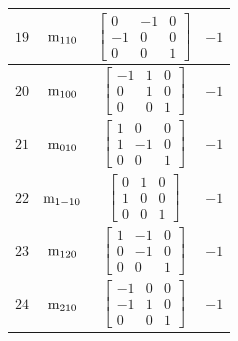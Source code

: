 \documentclass[fleqn,8pt]{jsarticle}
\begin{document}
\begin{longtable}{cccc}
$ 19 $ & $ {\rm m}_{110} $ & $ \begin{bmatrix} 0 & -1 & 0 \\ -1 & 0 & 0 \\ 0 & 0 & 1 \end{bmatrix} $ & $ -1 $ \\ \hline
$ 20 $ & $ {\rm m}_{100} $ & $ \begin{bmatrix} -1 & 1 & 0 \\ 0 & 1 & 0 \\ 0 & 0 & 1 \end{bmatrix} $ & $ -1 $ \\ \hline
$ 21 $ & $ {\rm m}_{010} $ & $ \begin{bmatrix} 1 & 0 & 0 \\ 1 & -1 & 0 \\ 0 & 0 & 1 \end{bmatrix} $ & $ -1 $ \\ \hline
$ 22 $ & $ {\rm m}_{1-10} $ & $ \begin{bmatrix} 0 & 1 & 0 \\ 1 & 0 & 0 \\ 0 & 0 & 1 \end{bmatrix} $ & $ -1 $ \\ \hline
$ 23 $ & $ {\rm m}_{120} $ & $ \begin{bmatrix} 1 & -1 & 0 \\ 0 & -1 & 0 \\ 0 & 0 & 1 \end{bmatrix} $ & $ -1 $ \\ \hline
$ 24 $ & $ {\rm m}_{210} $ & $ \begin{bmatrix} -1 & 0 & 0 \\ -1 & 1 & 0 \\ 0 & 0 & 1 \end{bmatrix} $ & $ -1 $ \\
\end{longtable}
\end{document}
